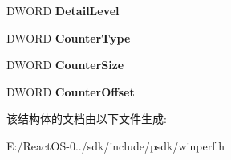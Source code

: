 \begin{DoxyCompactItemize}
\item 
\mbox{\label{struct___p_e_r_f___c_o_u_n_t_e_r___d_e_f_i_n_i_t_i_o_n_a0fc0d94b86dfd9835913c58cc98c0f1c}} 
D\+W\+O\+RD {\bfseries Detail\+Level}
\item 
\mbox{\label{struct___p_e_r_f___c_o_u_n_t_e_r___d_e_f_i_n_i_t_i_o_n_a5412b7d52896232b2af6cdfded1a2d9e}} 
D\+W\+O\+RD {\bfseries Counter\+Type}
\item 
\mbox{\label{struct___p_e_r_f___c_o_u_n_t_e_r___d_e_f_i_n_i_t_i_o_n_a045f920df5f75141f9b09772c2606220}} 
D\+W\+O\+RD {\bfseries Counter\+Size}
\item 
\mbox{\label{struct___p_e_r_f___c_o_u_n_t_e_r___d_e_f_i_n_i_t_i_o_n_a688aff04be8eb79fe35ce21fb55f4a49}} 
D\+W\+O\+RD {\bfseries Counter\+Offset}
\end{DoxyCompactItemize}


该结构体的文档由以下文件生成\+:\begin{DoxyCompactItemize}
\item 
E\+:/\+React\+O\+S-\/0../sdk/include/psdk/winperf.\+h\end{DoxyCompactItemize}
